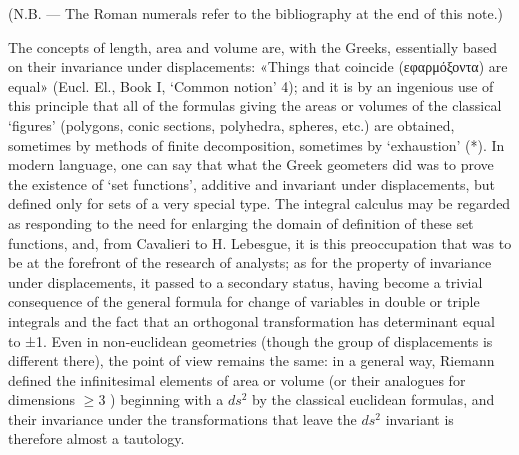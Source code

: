 \relax{}
(N.B. --- The Roman numerals refer to the bibliography at the end of this note.)

The concepts of length, area and volume are, with the Greeks, essentially based on their invariance under displacements: «Things that coincide (εφαρμόξοντα) are equal» (Eucl. El., Book I, `Common notion' 4); and it is by an ingenious use of this principle that all of the formulas giving the areas or volumes of the classical `figures' (polygons, conic sections, polyhedra, spheres, etc.) are obtained, sometimes by methods of finite decomposition, sometimes by `exhaustion' (*). In modern language, one can say that what the Greek geometers did was to prove the existence of `set functions', additive and invariant under displacements, but defined only for sets of a very special type. The integral calculus may be regarded as responding to the need for enlarging the domain of definition of these set functions, and, from Cavalieri to H. Lebesgue, it is this preoccupation that was to be at the forefront of the research of analysts; as for the property of invariance under displacements, it passed to a secondary status, having become a trivial consequence of the general formula for change of variables in double or triple integrals and the fact that an orthogonal transformation has determinant equal to ±1. Even in non-euclidean geometries (though the group of displacements is different there), the point of view remains the same: in a general way, Riemann defined the infinitesimal elements of area or volume (or their analogues for dimensions \(\geqslant3\) ) beginning with a \(ds^{2}\) by the classical euclidean formulas, and their invariance under the transformations that leave the \(ds^{2}\) invariant is therefore almost a tautology.

